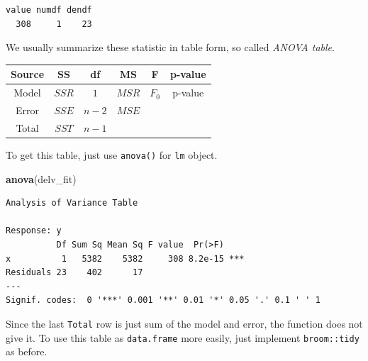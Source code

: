 \documentclass[]{book}
\newenvironment{Shaded}{\begin{snugshade}}{\end{snugshade}}
\newcommand{\KeywordTok}[1]{\textcolor[rgb]{0.13,0.29,0.53}{\textbf{#1}}}
\newcommand{\NormalTok}[1]{#1}
\newcommand{\OperatorTok}[1]{\textcolor[rgb]{0.81,0.36,0.00}{\textbf{#1}}}
\newcommand{\StringTok}[1]{\textcolor[rgb]{0.31,0.60,0.02}{#1}}
\theoremstyle{definition}
\theoremstyle{definition}
\theoremstyle{definition}
\theoremstyle{remark}
\begin{document}
\begin{Shaded}
\end{Shaded}

\begin{verbatim}
value numdf dendf 
  308     1    23 
\end{verbatim}

We usually summarize these statistic in table form, so called \emph{ANOVA table}.

\begin{longtable}[]{@{}cccccc@{}}
\toprule
Source & SS & df & MS & F & p-value\tabularnewline
\midrule
\endhead
Model & \(SSR\) & \(1\) & \(MSR\) & \(F_0\) & p-value\tabularnewline
Error & \(SSE\) & \(n - 2\) & \(MSE\) & &\tabularnewline
Total & \(SST\) & \(n - 1\) & & &\tabularnewline
\bottomrule
\end{longtable}

To get this table, just use \texttt{anova()} for \texttt{lm} object.

\begin{Shaded}
\begin{Highlighting}[]
\KeywordTok{anova}\NormalTok{(delv_fit)}
\end{Highlighting}
\end{Shaded}

\begin{verbatim}
Analysis of Variance Table

Response: y
          Df Sum Sq Mean Sq F value  Pr(>F)    
x          1   5382    5382     308 8.2e-15 ***
Residuals 23    402      17                    
---
Signif. codes:  0 '***' 0.001 '**' 0.01 '*' 0.05 '.' 0.1 ' ' 1
\end{verbatim}

Since the last \texttt{Total} row is just sum of the model and error, the function does not give it. To use this table as \texttt{data.frame} more easily, just implement \texttt{broom::tidy} as before.

\begin{Shaded}
\end{Shaded}
\end{document}
